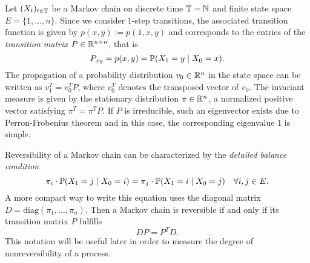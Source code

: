 Let $(X_t)_{t\in\mathbb{T}}$ be a Markov chain on discrete time $\mathbb{T} = \mathbb{N}$ and finite state space $E = \{1,\dots,n\}$.
Since we consider $1$-step transitions, the associated transition function is given by $p(x,y) := p(1,x,y)$ and corresponds to the entries of the \textit{transition matrix} $P\in \mathbb{R}^{n \times n}$, that is
\begin{equation*}
P_{xy} = p(x,y) = \mathbb{P}(X_1 = y \mid X_0 = x).
\end{equation*}
The propagation of a probability distribution $v_0 \in \mathbb{R}^n$ in the state space can be written as $v_1^T = v_0^T P$, where $v_0^T$ denotes the transposed vector of $v_0$.
The invariant measure is given by the stationary distribution $\pi \in \mathbb{R}^n$, a normalized positive vector satisfying $\pi^T = \pi^T P$.
If $P$ is irreducible, such an eigenvector exists due to Perron-Frobenius theorem\cite[P7.3.5]{golub1996} and in this case, the corresponding eigenvalue $1$ is simple.

Reversibility of a Markov chain can be characterized by the \textit{detailed balance condition}
\begin{equation*}
\pi_i \cdot \mathbb{P}(X_1 = j \mid X_0 = i) = \pi_j \cdot \mathbb{P}(X_1 = i \mid X_0 = j) \ \ \ \forall i,j \in E.
\end{equation*}
A more compact way to write this equation uses the diagonal matrix $D = \textrm{diag}(\pi_1,\dots,\pi_n)$.
Then a Markov chain is reversible if and only if its transition matrix $P$ fulfills
\begin{equation}
\label{eq:detailed}
DP = P^T D.
\end{equation}
This notation will be useful later in order to measure the degree of nonreversibility of a process.